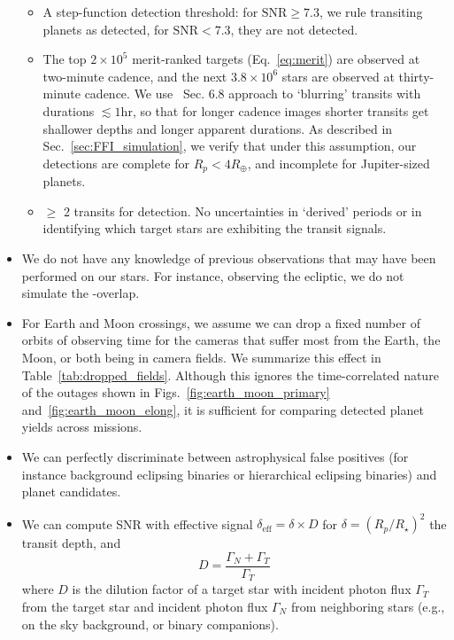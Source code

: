 \begin{itemize}
	\begin{itemize}
		\item A step-function detection threshold: for $\mathrm{SNR} \geq 7.3$, we rule transiting planets as detected, for $\mathrm{SNR} < 7.3$, they are not detected.
		\item The top $2\times 10^5$ merit-ranked targets (Eq.~\ref{eq:merit}) are observed at two-minute cadence, and the next $3.8\times10^6$ stars are observed at thirty-minute cadence.
		We use~ Sec. 6.8 approach to `blurring' transits with durations $\lesssim 1\mathrm{hr}$, so that for longer cadence images shorter transits get shallower depths and longer apparent durations.
		As described in Sec.~\ref{sec:FFI_simulation}, we verify that under this assumption, our detections are complete for $R_p<4R_\oplus$, and incomplete for Jupiter-sized planets.
		\item $\geq$ 2 transits for detection. No uncertainties in `derived' periods or in identifying which target stars are exhibiting the transit signals.
	\end{itemize}
	\item We do not have any knowledge of previous observations that may have been performed on our stars.
	For instance, observing the ecliptic, we do not simulate the \tess-\ktwo overlap.
	\item For Earth and Moon crossings, we assume we can drop a fixed number of orbits of observing time for the cameras that suffer most from the Earth, the Moon, or both being in \tesss camera fields. We summarize this effect in Table~\ref{tab:dropped_fields}. Although this ignores the time-correlated nature of the outages shown in Figs.~\ref{fig:earth_moon_primary} and~\ref{fig:earth_moon_elong}, it is sufficient for comparing detected planet yields across missions.
	\item We can perfectly discriminate between astrophysical false positives (for instance background eclipsing binaries or hierarchical eclipsing binaries) and planet candidates.
	\item We can compute SNR with effective signal $\delta_\text{eff} = \delta \times D$ for $\delta=(R_p/R_\star)^2$ the transit depth, and
	\begin{equation}
	D = \frac{\Gamma_N + \Gamma_T}{\Gamma_T} 
	\end{equation}
	where $D$ is the dilution factor of a target star with incident photon flux $\Gamma_T$ from the target star and incident photon flux $\Gamma_N$ from neighboring stars (e.g., on the sky background, or binary companions). 
	

\end{itemize}
